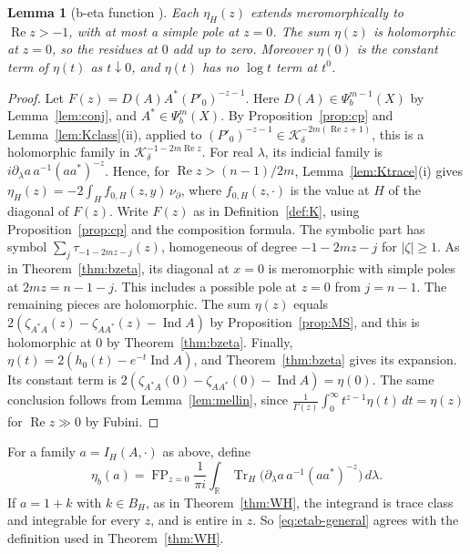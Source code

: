 \documentclass[11pt,oneside,reqno]{article}
\DeclareMathOperator{\Tr}{Tr}
\theoremstyle{plain}
\newtheorem{lemma}[theorem]{Lemma}
\theoremstyle{definition}
\theoremstyle{remark}
\begin{document}
\begin{lemma}[b-eta function {\cite[Lemma~8.4]{LoyaThesis}}]\label{lem:etaH}
Each \(\eta_H(z)\) extends meromorphically to \(\operatorname{Re}z>-1\), with
at most a simple pole at \(z=0\). The sum \(\eta(z)\) is holomorphic at
\(z=0\), so the residues at \(0\) add up to zero. Moreover
\(\eta(0)\) is the constant term of \(\eta(t)\) as \(t\downarrow0\), and
\(\eta(t)\) has no \(\log t\) term at \(t^0\).
\end{lemma}

\begin{proof}
Let \(F(z)=D(A)A^*(P'_0)^{-z-1}\). Here \(D(A)\in\Psi_b^{m-1}(X)\) by
Lemma~\ref{lem:conj}, and \(A^*\in\Psi_b^m(X)\). By
Proposition~\ref{prop:cp} and Lemma~\ref{lem:Kclass}(ii), applied to
\((P'_0)^{-z-1}\in\mathcal K^{-2m(\operatorname{Re}z+1)}_\delta\), this is a
holomorphic family in
\(\mathcal K^{-1-2m\operatorname{Re}z}_\delta\). For real \(\lambda\), its
indicial family is \(i\partial_\lambda a\,a^{-1}(aa^*)^{-z}\). Hence, for
\(\operatorname{Re}z>(n-1)/2m\), Lemma~\ref{lem:Ktrace}(i) gives
\(\eta_H(z)=-2\int_Hf_{0,H}(z,y)\,\nu_\partial\), where \(f_{0,H}(z,\cdot)\)
is the value at \(H\) of the diagonal of \(F(z)\). Write \(F(z)\) as in
Definition~\ref{def:K}, using Proposition~\ref{prop:cp} and the composition
formula. The symbolic part has symbol
\(\sum_j\tau_{-1-2mz-j}(z)\), homogeneous of degree \(-1-2mz-j\) for
\(|\zeta|\geq1\). As in Theorem~\ref{thm:bzeta}, its diagonal at \(x=0\) is
meromorphic with simple poles at \(2mz=n-1-j\). This includes a possible
pole at \(z=0\) from \(j=n-1\). The remaining pieces are holomorphic. The
sum \(\eta(z)\) equals \(2(\zeta_{A^*A}(z)-\zeta_{AA^*}(z)-\operatorname{Ind}A)\)
by Proposition~\ref{prop:MS}, and this is holomorphic at \(0\) by
Theorem~\ref{thm:bzeta}. Finally,
\(\eta(t)=2(h_0(t)-e^{-t}\operatorname{Ind}A)\), and Theorem~\ref{thm:bzeta}
gives its expansion. Its constant term is
\(2(\zeta_{A^*A}(0)-\zeta_{AA^*}(0)-\operatorname{Ind}A)=\eta(0)\). The same
conclusion follows from Lemma~\ref{lem:mellin}, since
\(\frac1{\Gamma(z)}\int_0^\infty t^{z-1}\eta(t)\,dt=\eta(z)\) for
\(\operatorname{Re}z\gg0\) by Fubini.
\end{proof}

For a family \(a=I_H(A,\cdot)\) as above, define
\begin{equation}\label{eq:etab-general}
 \eta_b(a)=\operatorname{FP}_{z=0}\frac1{\pi i}\int_{\mathbb R}
 \Tr_H\bigl(\partial_\lambda a\,a^{-1}(aa^*)^{-z}\bigr)\,d\lambda .
\end{equation}
If \(a=1+k\) with \(k\in B_H\), as in Theorem~\ref{thm:WH}, the integrand is
trace class and integrable for every \(z\), and is entire in \(z\). So
\eqref{eq:etab-general} agrees with the definition used in
Theorem~\ref{thm:WH}.
\end{document}
